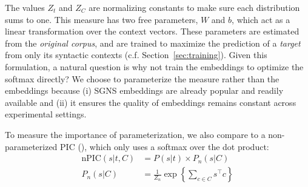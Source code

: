 \documentclass[12pt]{article}
\begin{document}
The values $Z_t$ and $Z_C$ are normalizing constants to make sure each
distribution sums to one. This measure has two free parameters, $W$ and $b$,
which act as a linear transformation over the context vectors. These parameters
are estimated from the {\em original corpus}, and are trained to maximize
the prediction of a {\em target} from only its syntactic contexts (c.f. Section~\ref{sec:training}).
Given this formulation, a natural question is why not train the embeddings to optimize the
softmax directly? We choose to parameterize the measure rather than the
embeddings because (i) SGNS embeddings are already popular and readily
available and
(ii) it ensures the quality of embeddings remains constant across experimental 
settings.

To measure the importance of parameterization, we
also compare to a non-parameterized PIC (\ourmeas), which only uses a softmax over the
dot product:
\begin{equation}
  \begin{aligned}
  \mbox{nPIC}(s | t, C) &= P(s | t) \times P_n(s | C)\\
  P_n(s | C) &= \frac{1}{Z_n}\exp\left\{\sum_{c\in C}s^\top c\right\} %
  \end{aligned}
  \label{eqn:npic}
\end{equation}
\end{document}
